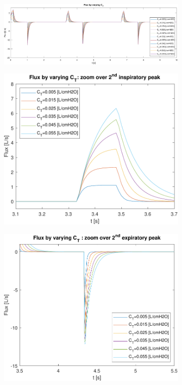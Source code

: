 \begin{figure}[t!]
	\begin{subfigure}{\linewidth}
		\centering
		\includegraphics[width=0.95\linewidth]{../model/data_log/CwCL_flux_total.pdf}
		\caption{}
	\end{subfigure}\hfill
	\begin{subfigure}{0.5\linewidth}
		\centering
		\includegraphics[width=0.95\linewidth]{../model/data_log/CwCL_flux_zoom1.pdf}
		\caption{}
	\end{subfigure}\hfill
	\begin{subfigure}{0.5\linewidth}
		\centering
		\includegraphics[width=0.95\linewidth]{../model/data_log/CwCL_flux_zoom2.pdf}

\end{subfigure}
\end{figure}
